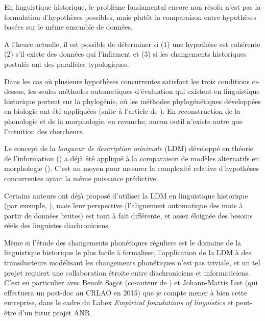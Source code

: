 \documentclass[oldfontcommands,oneside,a4paper,11pt]{article}
\begin{document}
En linguistique historique, le problème fondamental encore non résolu n'est pas la formulation d'hypothèses possibles, mais plutôt la comparaison entre hypothèses basées sur le même ensemble de données. 

A l'heure actuelle, il est possible de déterminer si (1) une hypothèse est cohérente (2) s'il existe des données qui l'infirment et (3) si les changements historiques postulés ont des parallèles typologiques. 

Dans les cas où plusieurs hypothèses concurrentes satisfont les trois conditions ci-dessus, les seules méthodes automatiques d'évaluation qui existent en linguistique historique portent sur la phylogénie, où les méthodes phylogénétiques développées en biologie ont été appliquées (suite à l'article de \citealt{gray03ie}). En reconstruction de la phonologie et de la morphologie, en revanche, aucun outil n'existe autre que l'intuition des chercheurs. 

Le concept de la \textit{longueur de description minimale} (LDM) développé en théorie de l'information (\citealt{rissanen84}) a déjà été appliqué à la comparaison de modèles alternatifs en morphologie (\citealt{walther14compactness}). C'est un moyen pour mesurer la complexité relative d'hypothèses concurrentes ayant la même puissance prédictive. 

Certains auteurs ont déjà proposé d'utiliser la  LDM en linguistique historique (par exemple, \citealt{hiltunen12mdl}), mais leur perspective (l'alignement automatique des mots à partir de données brutes) est tout à fait différente, et assez éloignée des besoins réels des linguistes diachroniciens.

Même si l'étude des changements phonétiques réguliers est le domaine de la linguistique historique le plus facile à formaliser, l'application de la LDM à des transducteurs modélisant les changements phonétiques n'est pas triviale, et un tel projet requiert une collaboration étroite entre diachroniciens et informaticiens. C'est en particulier avec Benoît Sagot (co-auteur de \citealt{walther14compactness}) et Johann-Mattis List (qui effectuera un post-doc au CRLAO en 2015) que je compte mener à bien cette entreprise, dans le cadre du Labex \textit{Empirical foundations of linguistics} et peut-être d'un futur projet ANR.
\end{document}
